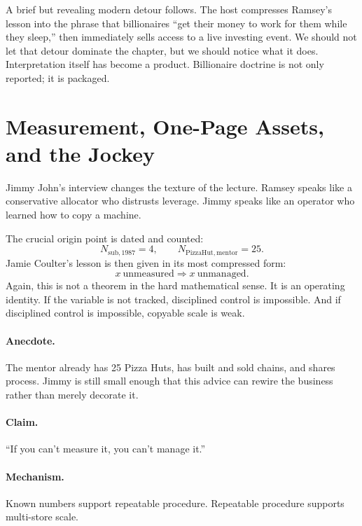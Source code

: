 A brief but revealing modern detour follows. The host compresses Ramsey's lesson into the phrase that billionaires ``get their money to work for them while they sleep,'' then immediately sells access to a live investing event. We should not let that detour dominate the chapter, but we should notice what it does. Interpretation itself has become a product. Billionaire doctrine is not only reported; it is packaged.

\section{Measurement, One-Page Assets, and the Jockey}

Jimmy John's interview changes the texture of the lecture. Ramsey speaks like a conservative allocator who distrusts leverage. Jimmy speaks like an operator who learned how to copy a machine.

The crucial origin point is dated and counted:
\begin{equation}
N_{\mathrm{sub},1987}=4,\qquad N_{\mathrm{PizzaHut,mentor}}=25.
\end{equation}
Jamie Coulter's lesson is then given in its most compressed form:
\begin{equation}
x\ \text{unmeasured} \Rightarrow x\ \text{unmanaged}.
\end{equation}
Again, this is not a theorem in the hard mathematical sense. It is an operating identity. If the variable is not tracked, disciplined control is impossible. And if disciplined control is impossible, copyable scale is weak.

\paragraph{Anecdote.} The mentor already has 25 Pizza Huts, has built and sold chains, and shares process. Jimmy is still small enough that this advice can rewire the business rather than merely decorate it.

\paragraph{Claim.} ``If you can't measure it, you can't manage it.''

\paragraph{Mechanism.} Known numbers support repeatable procedure. Repeatable procedure supports multi-store scale.

